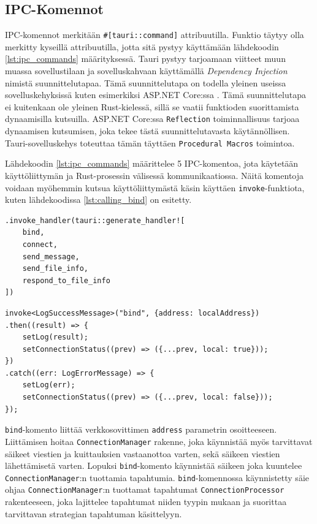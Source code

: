 \documentclass[a4paper,12pt]{article}
\begin{document}
    \subsection{IPC-Komennot}
    IPC-komennot merkitään \lstinline{#[tauri::command]} attribuutilla. Funktio täytyy olla merkitty kyseillä attribuutilla, jotta sitä pystyy käyttämään lähdekoodin \ref{lst:ipc_commands} määrityksessä. Tauri pystyy tarjoamaan viitteet muun muassa sovellustilaan ja sovelluskahvaan käyttämällä \textit{Dependency Injection} nimistä suunnittelutapaa. Tämä suunnittelutapa on todella yleinen useissa sovelluskehyksissä kuten esimerkiksi ASP.NET Core:ssa \cite{DI_dotnet}. Tämä suunnittelutapa ei kuitenkaan ole yleinen Rust-kielessä, sillä se vaatii funktioden suorittamista dynaamisilla kutsuilla.
    ASP.NET Core:ssa \lstinline{Reflection} toiminnallisuus tarjoaa dynaamisen kutsumisen, joka tekee tästä suunnittelutavasta käytännöllisen.
    Tauri-sovelluskehys toteuttaa tämän täyttäen \lstinline{Procedural Macros} toimintoa. 


    Lähdekoodin \ref{lst:ipc_commands} määrittelee 5 IPC-komentoa, jota käytetään käyttöliittymän ja Rust-prosessin välisessä kommunikaatiossa. Näitä komentoja voidaan myöhemmin kutsua käyttöliittymästä käsin käyttäen \lstinline{invoke}-funktiota, kuten lähdekoodissa \ref{lst:calling_bind} on esitetty. \par

    \begin{lstlisting}[caption={IPC-komentojen määritys}, label={lst:ipc_commands}]
.invoke_handler(tauri::generate_handler![
    bind,
    connect,
    send_message,
    send_file_info,
    respond_to_file_info
])\end{lstlisting}

    \begin{lstlisting}[caption={'bind'-komennon kutsuminen}, label={lst:calling_bind}]
invoke<LogSuccessMessage>("bind", {address: localAddress})
.then((result) => {
    setLog(result);
    setConnectionStatus((prev) => ({...prev, local: true}));
})
.catch((err: LogErrorMessage) => {
    setLog(err);
    setConnectionStatus((prev) => ({...prev, local: false}));
});\end{lstlisting}

    \lstinline{bind}-komento liittää verkkosovittimen \lstinline{address} parametrin osoitteeseen. Liittämisen hoitaa \lstinline{ConnectionManager} rakenne, joka käynnistää myös tarvittavat säikeet viestien ja kuittauksien vastaanottoa varten, sekä säikeen viestien lähettämisetä varten. Lopuksi \lstinline{bind}-komento käynnistää säikeen joka kuuntelee \lstinline{ConnectionManager}:n tuottamia tapahtumia.
    \lstinline{bind}-komennossa käynnistetty säie ohjaa \lstinline{ConnectionManager}:n tuottamat tapahtumat \lstinline{ConnectionProcessor} rakenteeseen, joka lajittelee tapahtumat niiden tyypin mukaan ja suorittaa tarvittavan strategian tapahtuman käsittelyyn.\par
\end{document}
